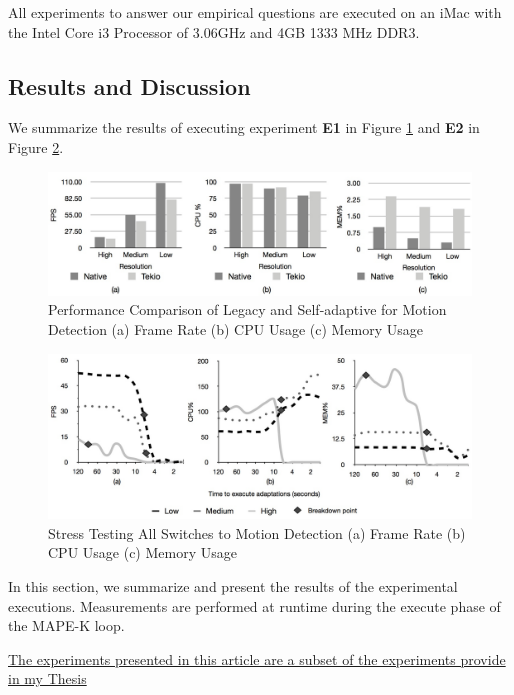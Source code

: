 \documentclass{acm_proc_article-sp}
\begin{document}
All experiments to answer our empirical questions  are executed on an iMac with the Intel Core i3 Processor of 3.06GHz and 4GB 1333 MHz DDR3.
	
\subsection{Results and Discussion}
\label{sec:sec:resultsdiscussion}

We summarize the results of executing experiment \textbf{E1} in Figure \ref{fig:performanceComparison} and  \textbf{E2} in Figure \ref{fig:stressTesting}.
	\begin{figure}
	\centering %
		\includegraphics[scale=0.55]{images/MotionDetectionComparison.jpg} 
		\caption{Performance Comparison of Legacy and Self-adaptive for Motion Detection (a) Frame Rate (b) CPU Usage (c) Memory Usage }
		 \label{fig:performanceComparison} 
	\end{figure}
	
	\begin{figure}
	\centering 
		\includegraphics[scale=0.55]{images/StressTesting.jpg}
		 \caption{Stress Testing All Switches to Motion Detection (a) Frame Rate (b) CPU Usage (c) Memory Usage}
		 \label{fig:stressTesting} 
	\end{figure}


In this section, we summarize and present the results of the experimental executions. Measurements are performed at runtime during the execute phase of the MAPE-K loop.

\underline{The experiments presented in this article are a subset of the experiments provide in my Thesis}
\end{document}

